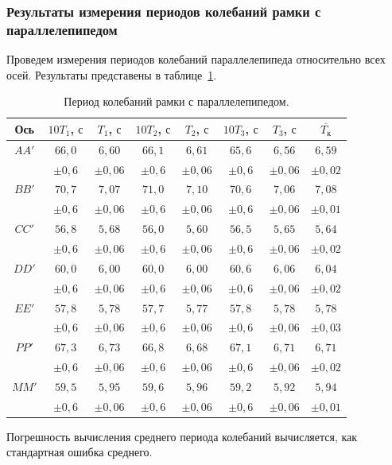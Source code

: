 \documentclass[a4paper,11pt]{article}
\begin{document}
\subsubsection{Результаты измерения периодов колебаний рамки с параллелепипедом} %
Проведем измерения периодов колебаний параллелепипеда относительно всех осей. Результаты представены в таблице~\ref{table:tab4}.
\begin{table}[h!]
\centering
\begin{tabular}{ ||c|c|c|c|c|c|c|c|| }
  \hline
  Ось & $10 T_{1}$, $с$ & $T_{1}$, $с$ & $10 T_{2}$, $с$ & $T_{2}$, $с$ & $10 T_{3}$, $с$ & $T_{3}$, $с$ & $\overline{T_{к}}$ \\
  \hline
  $AA'$ & $66,0$ & $6,60$ & $66,1$ & $6,61$ & $65,6$ & $6,56$ & $6,59$ \\
   & $\pm 0,6$ & $\pm 0,06$ & $\pm 0,6$ & $\pm 0,06$ & $\pm 0,6$ & $\pm 0,06$ & $\pm 0,02$ \\
  $BB'$ & $70,7$ & $7,07$ & $71,0$ & $7,10$ & $70,6$ & $7,06$ & $7,08$ \\
   & $\pm 0,6$ & $\pm 0,06$ & $\pm 0,6$ & $\pm 0,06$ & $\pm 0,6$ & $\pm 0,06$ & $\pm 0,01$ \\
  $CC'$ & $56,8$ & $5,68$ & $56,0$ & $5,60$ & $56,5$ & $5,65$ & $5,64$ \\
   & $\pm 0,6$ & $\pm 0,06$ & $\pm 0,6$ & $\pm 0,06$ & $\pm 0,6$ & $\pm 0,06$ & $\pm 0,02$ \\
  $DD'$ & $60,0$ & $6,00$ & $60,0$ & $6,00$ & $60,6$ & $6,06$ & $6,04$ \\
   & $\pm 0,6$ & $\pm 0,06$ & $\pm 0,6$ & $\pm 0,06$ & $\pm 0,6$ & $\pm 0,06$ & $\pm 0,02$ \\
  $EE'$ & $57,8$ & $5,78$ & $57,7$ & $5,77$ & $57,8$ & $5,78$ & $5,78$ \\
   & $\pm 0,6$ & $\pm 0,06$ & $\pm 0,6$ & $\pm 0,06$ & $\pm 0,6$ & $\pm 0,06$ & $\pm 0,03$ \\
  $PP'$ & $67,3$ & $6,73$ & $66,8$ & $6,68$ & $67,1$ & $6,71$ & $6,71$ \\
   & $\pm 0,6$ & $\pm 0,06$ & $\pm 0,6$ & $\pm 0,06$ & $\pm 0,6$ & $\pm 0,06$ & $\pm 0,02$ \\
  $MM'$ & $59,5$ & $5,95$ & $59,6$ & $5,96$ & $59,2$ & $5,92$ & $5,94$ \\
   & $\pm 0,6$ & $\pm 0,06$ & $\pm 0,6$ & $\pm 0,06$ & $\pm 0,6$ & $\pm 0,06$ & $\pm 0,01$ \\
  \hline
\end{tabular}
\caption{Период колебаний рамки с параллелепипедом.}
\label{table:tab4}
\end{table}\newline
Погрешность вычисления среднего периода колебаний вычисляется, как стандартная ошибка среднего.
\end{document}

